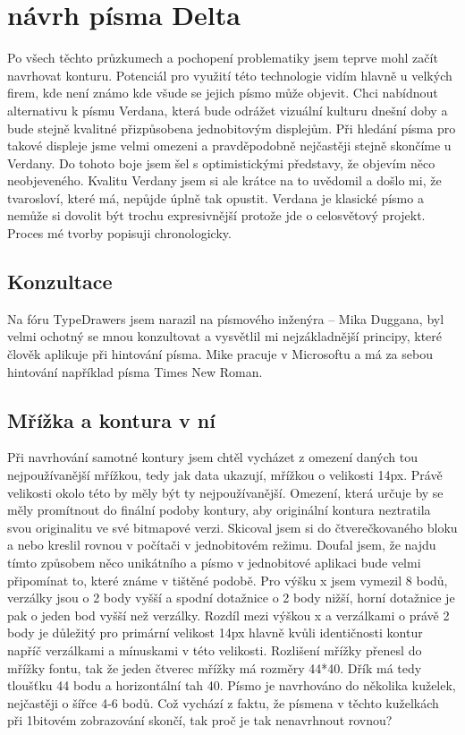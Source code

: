 \documentclass[a4paper]{article}
\begin{document}
\section{návrh písma Delta}
Po všech těchto průzkumech a pochopení problematiky jsem teprve mohl začít navrhovat konturu. Potenciál pro využití této technologie vidím hlavně u velkých firem, kde není známo kde všude se jejich písmo může objevit. Chci nabídnout alternativu k písmu Verdana, která bude odrážet vizuální kulturu dnešní doby a bude stejně kvalitné přizpůsobena jednobitovým displejům. Při hledání písma pro takové displeje jsme velmi omezeni a pravděpodobně nejčastěji stejně skončíme u Verdany. Do tohoto boje jsem šel s optimistickými představy, že objevím něco neobjeveného. Kvalitu Verdany jsem si ale krátce na to uvědomil a došlo mi, že tvarosloví, které má, nepůjde úplně tak opustit. Verdana je klasické písmo a nemůže si dovolit být trochu expresivnější protože jde o celosvětový projekt. Proces mé tvorby popisuji chronologicky.
\subsection{Konzultace}
Na fóru TypeDrawers jsem narazil na písmového inženýra – Mika Duggana, byl velmi ochotný se mnou konzultovat a vysvětlil mi nejzákladnější principy, které člověk aplikuje při hintování písma. Mike pracuje v Microsoftu a má za sebou hintování například písma Times New Roman.
\subsection{Mřížka a kontura v ní}
Při navrhování samotné kontury jsem chtěl vycházet z omezení daných tou nejpoužívanější mřížkou, tedy jak data ukazují, mřížkou o velikosti 14px. Právě velikosti okolo této by měly být ty nejpoužívanější. Omezení, která určuje by se měly promítnout do finální podoby kontury, aby originální kontura neztratila svou originalitu ve své bitmapové verzi. Skicoval jsem si do čtverečkovaného bloku a nebo kreslil rovnou v počítači v jednobitovém režimu. Doufal jsem, že najdu tímto způsobem něco unikátního a písmo v jednobitové aplikaci bude velmi připomínat to, které známe v tištěné podobě. Pro výšku x jsem vymezil 8 bodů, verzálky jsou o 2 body vyšší a spodní dotažnice o 2 body nižší, horní dotažnice je pak o jeden bod vyšší než verzálky. Rozdíl mezi výškou x a verzálkami o právě 2 body je důležitý pro primární velikost 14px hlavně kvůli identičnosti kontur napříč verzálkami a mínuskami v této velikosti. Rozlišení mřížky přenesl do mřížky fontu, tak že jeden čtverec mřížky má rozměry 44*40. Dřík má tedy tloušťku 44 bodu a horizontální tah 40. Písmo je navrhováno do několika kuželek, nejčastěji o šířce 4-6 bodů. Což vychází z faktu, že písmena v těchto kuželkách při 1bitovém zobrazování skončí, tak proč je tak nenavrhnout rovnou?
\end{document}
